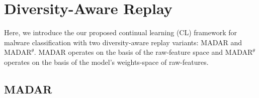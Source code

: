 
\section{Diversity-Aware Replay}
\label{divreplay}

Here, we introduce the our proposed continual learning (CL) framework for malware classification with two diversity-aware replay variants: MADAR and MADAR$^\theta$. MADAR operates on the basis of the raw-feature space and MADAR$^\theta$ operates on the basis of the model's weights-space of raw-features. 



\subsection{MADAR}
\label{subsec:ifs}



